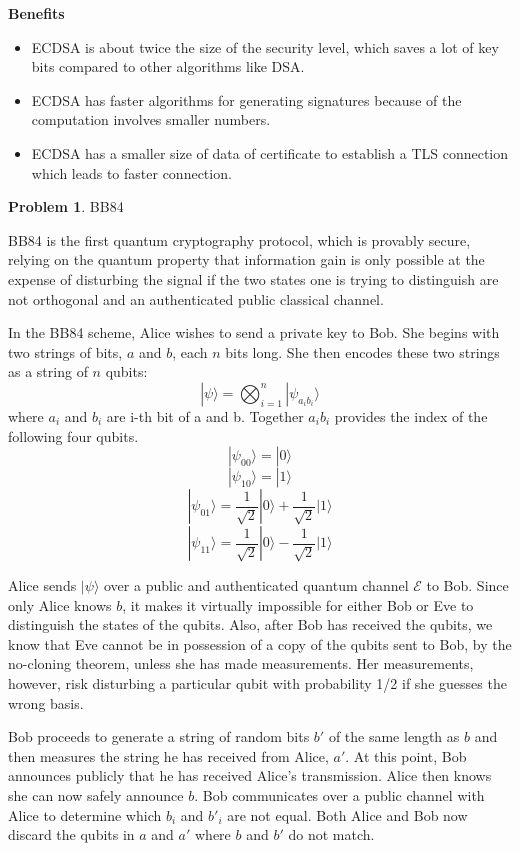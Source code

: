 \documentclass[12pt]{article}
\theoremstyle{definition}
\newtheorem{problem}{Problem}
\begin{document}
\textbf{Benefits}
\begin{itemize}
    \item ECDSA is about twice the size of the security level, which saves a lot of key bits compared to other algorithms like DSA.
    \item ECDSA has faster algorithms for generating signatures because of the computation involves smaller numbers.
    \item ECDSA has a smaller size of data of certificate to establish a TLS connection which leads to faster connection.
\end{itemize}

\begin{problem}
BB84
\end{problem}
BB84 is the first quantum cryptography protocol, which is provably secure, relying on the quantum property that information gain is only possible at the expense of disturbing the signal if the two states one is trying to distinguish are not orthogonal and an authenticated public classical channel.

In the BB84 scheme, Alice wishes to send a private key to Bob. She begins with two strings of bits, $a$ and $b$, each $n$ bits long. She then encodes these two strings as a string of $n$ qubits:
$$|\psi\rangle=\bigotimes_{i=1}^n|\psi_{a_ib_i}\rangle$$
where $a_i$ and $b_i$ are i-th bit of a and b. Together $a_ib_i$ provides the index of the following four qubits.
$$|\psi_{00}\rangle=|0\rangle$$
$$|\psi_{10}\rangle=|1\rangle$$
$$|\psi_{01}\rangle=\frac{1}{\sqrt{2}}|0\rangle+\frac{1}{\sqrt{2}}|1\rangle$$
$$|\psi_{11}\rangle=\frac{1}{\sqrt{2}}|0\rangle-\frac{1}{\sqrt{2}}|1\rangle$$

Alice sends $|\psi \rangle$  over a public and authenticated quantum channel $\mathcal {E}$ to Bob. Since only Alice knows $b$, it makes it virtually impossible for either Bob or Eve to distinguish the states of the qubits. Also, after Bob has received the qubits, we know that Eve cannot be in possession of a copy of the qubits sent to Bob, by the no-cloning theorem, unless she has made measurements. Her measurements, however, risk disturbing a particular qubit with probability 1/2 if she guesses the wrong basis.

Bob proceeds to generate a string of random bits $b'$ of the same length as $b$ and then measures the string he has received from Alice, $a'$. At this point, Bob announces publicly that he has received Alice's transmission. Alice then knows she can now safely announce $b$. Bob communicates over a public channel with Alice to determine which $b_{i}$ and $b'_{i}$ are not equal. Both Alice and Bob now discard the qubits in $a$ and $a'$ where $b$ and $b'$ do not match.
\end{document}

